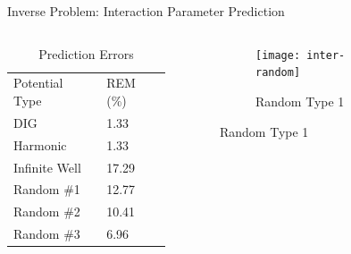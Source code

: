 \documentclass{beamer}
\begin{document}
\begin{frame}{Inverse Problem: Interaction Parameter Prediction}
    \begin{columns}
        \begin{column}{0.4\textwidth}
            \begin{table}[]
                \centering
                \caption{Prediction Errors}
                \begin{tabular}{ll}
                    Potential Type & REM (\%) \\
                    DIG            & 1.33     \\
                    Harmonic       & 1.33     \\
                    Infinite Well  & 17.29    \\
                    Random \#1     & 12.77    \\
                    Random \#2     & 10.41    \\
                    Random \#3     & 6.96                    
                \end{tabular}
            \end{table}
        \end{column}
        \begin{column}{0.8\textwidth}
        \graphicspath{{"../figs/training/interaction/"}}
        \begin{figure}[H]
            \begin{subfigure}[t]{0.80\textwidth}
                \texttt{[image: inter-random]}
            \caption{Random Type 1}
            \end{subfigure}
        \end{figure}
        \end{column}
    \end{columns}
\end{frame}
\end{document}
